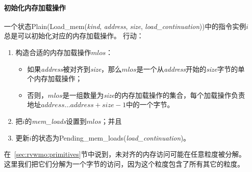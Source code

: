 \paragraph{初始化内存加载操作}\label{omm:initiate_load}
一个状态{\sc Plain}({\sc Load\_mem}({\it kind}, {\it address}, {\it size}, {\it load\_continuation}))中的指令实例$i$总是可以初始化对应的内存加载操作。
行动：
\begin{enumerate}
\item 构造合适的内存加载操作$mlos$：  %
  \begin{itemize}
  \item 如果{\it address}被对齐到{\it size}，那么$mlos$是一个从{\it address}开始的{\it size}字节的单个内存加载操作； %
  \item 否则，$mlos$是一组数量为{\it size}的内存加载操作的集合，每个加载操作负责地址$\textit{address}\ldots\textit{address}+\textit{size}-1$中的一个字节。  %
  \end{itemize}
\item 把$i$的{\it mem\_loads}设置到$mlos$；并且  %
\item 更新$i$的状态为{\sc Pending\_mem\_loads}({\it load\_continuation})。  %
\end{enumerate}

\begin{commentary}
  在~\ref{sec:rvwmo:primitives}节中说到，未对齐的内存访问可能在任意粒度被分解。这里我们把它们分解为一个字节的访问，因为这个粒度包含了所有其它的粒度。
\end{commentary}

